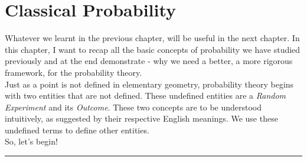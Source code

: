 \chapter{Classical Probability}\cite{joeblitztein}

Whatever we learnt in the previous chapter, will be useful in the next chapter. In this chapter, I want to recap all the basic concepts of probability we have studied previously and at the end demonstrate - why we need a better, a more rigorous framework, for the probability theory. \\

Just as a point is not defined in elementary geometry, probability theory begins with two entities that are not defined. These undefined entities are a \textit{Random Experiment} and its \textit{Outcome}. These two concepts are to be understood intuitively, as suggested by their respective English meanings. We use these undefined terms to define other entities. \\

So, let's begin!












\vspace{10pt}
\hrule